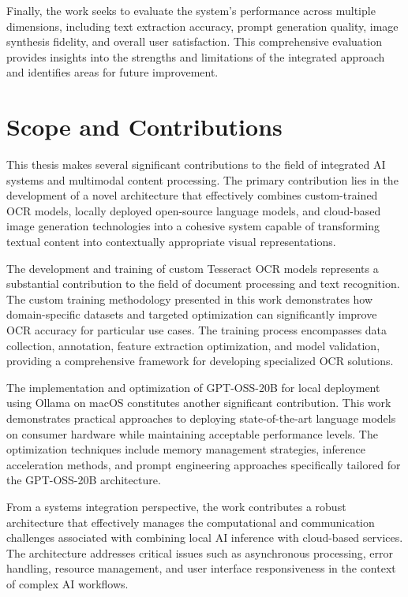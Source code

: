 Finally, the work seeks to evaluate the system's performance across multiple dimensions, including text extraction accuracy, prompt generation quality, image synthesis fidelity, and overall user satisfaction. This comprehensive evaluation provides insights into the strengths and limitations of the integrated approach and identifies areas for future improvement.

\section{Scope and Contributions}

This thesis makes several significant contributions to the field of integrated AI systems and multimodal content processing. The primary contribution lies in the development of a novel architecture that effectively combines custom-trained OCR models, locally deployed open-source language models, and cloud-based image generation technologies into a cohesive system capable of transforming textual content into contextually appropriate visual representations.

The development and training of custom Tesseract OCR models represents a substantial contribution to the field of document processing and text recognition. The custom training methodology presented in this work demonstrates how domain-specific datasets and targeted optimization can significantly improve OCR accuracy for particular use cases. The training process encompasses data collection, annotation, feature extraction optimization, and model validation, providing a comprehensive framework for developing specialized OCR solutions.

The implementation and optimization of GPT-OSS-20B for local deployment using Ollama on macOS constitutes another significant contribution. This work demonstrates practical approaches to deploying state-of-the-art language models on consumer hardware while maintaining acceptable performance levels. The optimization techniques include memory management strategies, inference acceleration methods, and prompt engineering approaches specifically tailored for the GPT-OSS-20B architecture.

From a systems integration perspective, the work contributes a robust architecture that effectively manages the computational and communication challenges associated with combining local AI inference with cloud-based services. The architecture addresses critical issues such as asynchronous processing, error handling, resource management, and user interface responsiveness in the context of complex AI workflows.

